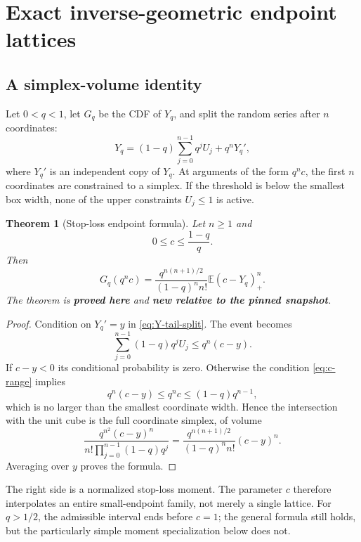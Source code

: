 \documentclass[11pt,oneside]{article}
\numberwithin{equation}{section}
\newtheorem{theorem}{Theorem}[section]
\theoremstyle{definition}
\theoremstyle{remark}
\newcommand{\E}{\mathbb E}
\newcommand{\proved}{\textcolor{deepgreen}{\textbf{proved here}}}
\newcommand{\auditnew}{\textcolor{deepviolet}{\textbf{new relative to the pinned snapshot}}}
\newcommand{\pospart}[1]{\left(#1\right)_{+}}
\begin{document}
\section{Exact inverse-geometric endpoint lattices}
\label{sec:endpoints}

\subsection{A simplex-volume identity}

Let $0<q<1$, let $G_q$ be the CDF of $Y_q$, and split the random series after
$n$ coordinates:
\begin{equation}
 Y_q=(1-q)\sum_{j=0}^{n-1}q^jU_j+q^nY_q',
 \label{eq:Y-tail-split}
\end{equation}
where $Y_q'$ is an independent copy of $Y_q$.  At arguments of the form
$q^nc$, the first $n$ coordinates are constrained to a simplex.  If the
threshold is below the smallest box width, none of the upper constraints
$U_j\le1$ is active.

\begin{theorem}[Stop-loss endpoint formula]
\label{thm:stop-loss-endpoint}
Let $n\ge1$ and
\begin{equation}
 0\le c\le\frac{1-q}{q}.
 \label{eq:c-range}
\end{equation}
Then
\begin{equation}
 \boxed{
 G_q(q^nc)=
 \frac{q^{n(n+1)/2}}{(1-q)^n n!}
 \E\pospart{c-Y_q}^{n}.}
 \label{eq:stop-loss-endpoint}
\end{equation}
The theorem is \proved{} and \auditnew.
\end{theorem}

\begin{proof}
Condition on $Y_q'=y$ in \eqref{eq:Y-tail-split}.  The event becomes
\[
 \sum_{j=0}^{n-1}(1-q)q^jU_j\le q^n(c-y).
\]
If $c-y<0$ its conditional probability is zero.  Otherwise the condition
\eqref{eq:c-range} implies
\[
 q^n(c-y)\le q^nc\le(1-q)q^{n-1},
\]
which is no larger than the smallest coordinate width.  Hence the intersection
with the unit cube is the full coordinate simplex, of volume
\[
 \frac{q^{n^2}(c-y)^n}
 {n!\prod_{j=0}^{n-1}(1-q)q^j}
 =\frac{q^{n(n+1)/2}}{(1-q)^nn!}(c-y)^n.
\]
Averaging over $y$ proves the formula.
\end{proof}

The right side is a normalized stop-loss moment.  The parameter $c$ therefore
interpolates an entire small-endpoint family, not merely a single lattice.
For $q>1/2$, the admissible interval ends before $c=1$; the general formula
still holds, but the particularly simple moment specialization below does not.
\end{document}

